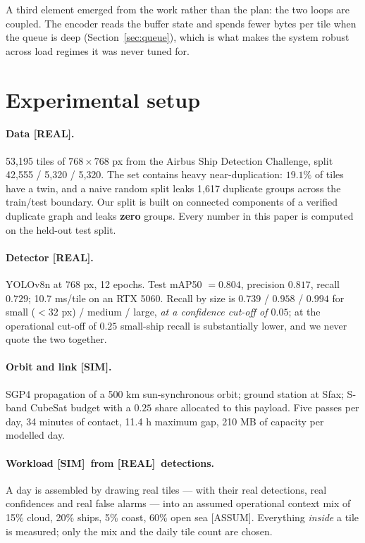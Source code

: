 \documentclass[10pt,a4paper]{article}
\newcommand{\REAL}{\textcolor{real}{\footnotesize\textsf{[REAL]}}}
\newcommand{\SIM}{\textcolor{sim}{\footnotesize\textsf{[SIM]}}}
\newcommand{\ASSUM}{\textcolor{warn}{\footnotesize\textsf{[ASSUM]}}}
\begin{document}
A third element emerged from the work rather than the plan: the two loops are coupled. The
encoder reads the buffer state and spends fewer bytes per tile when the queue is deep
(Section~\ref{sec:queue}), which is what makes the system robust across load regimes it was never
tuned for.

\section{Experimental setup}\label{sec:setup}

\paragraph{Data \REAL.} 53{,}195 tiles of $768\times768$ px from the Airbus Ship Detection
Challenge, split 42{,}555 / 5{,}320 / 5{,}320. The set contains heavy near-duplication: $19.1\%$
of tiles have a twin, and a naive random split leaks 1{,}617 duplicate groups across the
train/test boundary. Our split is built on connected components of a verified duplicate graph and
leaks \textbf{zero} groups. Every number in this paper is computed on the held-out test split.

\paragraph{Detector \REAL.} YOLOv8n at 768 px, 12 epochs. Test mAP50 $=0.804$, precision $0.817$,
recall $0.729$; 10.7 ms/tile on an RTX 5060. Recall by size is $0.739$ / $0.958$ / $0.994$ for
small ($<32$ px) / medium / large, \emph{at a confidence cut-off of $0.05$}; at the operational
cut-off of $0.25$ small-ship recall is substantially lower, and we never quote the two together.

\paragraph{Orbit and link \SIM.} SGP4 propagation of a 500 km sun-synchronous orbit; ground
station at Sfax; S-band CubeSat budget with a $0.25$ share allocated to this payload. Five passes
per day, 34 minutes of contact, 11.4 h maximum gap, 210 MB of capacity per modelled day.

\paragraph{Workload \SIM\ from \REAL\ detections.} A day is assembled by drawing real tiles ---
with their real detections, real confidences and real false alarms --- into an assumed
operational context mix of 15\% cloud, 20\% ships, 5\% coast, 60\% open sea \ASSUM. Everything
\emph{inside} a tile is measured; only the mix and the daily tile count are chosen.
\end{document}
